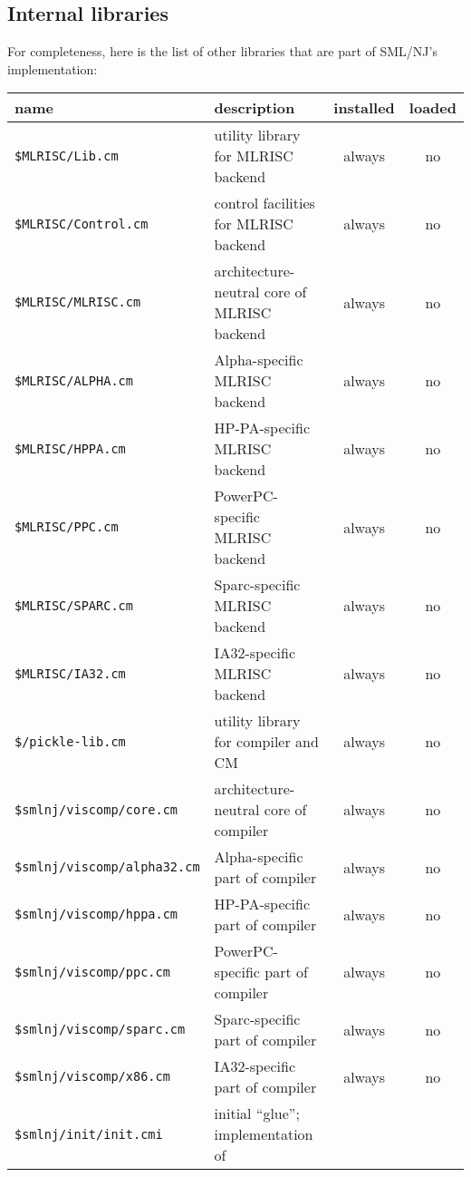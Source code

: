 \subsection{Internal libraries}

For completeness, here is the list of other libraries that are part of
SML/NJ's implementation:

\begin{small}
\begin{center}
\begin{tabular}{p{2.9in}||p{2.2in}|c|c}
name & description & installed & loaded \\
\hline\hline
{\tt \$MLRISC/Lib.cm} & utility library for MLRISC backend & always &
no \\
\hline 
{\tt \$MLRISC/Control.cm} & control facilities for MLRISC backend &
always & no \\
\hline
{\tt \$MLRISC/MLRISC.cm} & architecture-neutral core of MLRISC backend
& always & no \\
\hline
{\tt \$MLRISC/ALPHA.cm} & Alpha-specific MLRISC backend & always & no \\
\hline
{\tt \$MLRISC/HPPA.cm} & HP-PA-specific MLRISC backend & always & no \\
\hline
{\tt \$MLRISC/PPC.cm} & PowerPC-specific MLRISC backend & always & no \\
\hline
{\tt \$MLRISC/SPARC.cm} & Sparc-specific MLRISC backend & always & no \\
\hline 
{\tt \$MLRISC/IA32.cm} & IA32-specific MLRISC backend & always & no \\
\hline\hline
{\tt \$/pickle-lib.cm} & utility library for compiler and CM & always & no \\
\hline
{\tt \$smlnj/viscomp/core.cm} & architecture-neutral core of compiler
& always & no \\
\hline
{\tt \$smlnj/viscomp/alpha32.cm} & Alpha-specific part of compiler &
always & no \\
\hline
{\tt \$smlnj/viscomp/hppa.cm} & HP-PA-specific part of compiler &
always & no \\
\hline
{\tt \$smlnj/viscomp/ppc.cm} & PowerPC-specific part of compiler &
always & no \\
\hline
{\tt \$smlnj/viscomp/sparc.cm} & Sparc-specific part of compiler &
always & no \\
\hline
{\tt \$smlnj/viscomp/x86.cm} & IA32-specific part of compiler & always
& no \\
\hline \hline
{\tt \$smlnj/init/init.cmi} & initial ``glue''; implementation of

\end{tabular}
\end{center}
\end{small}
